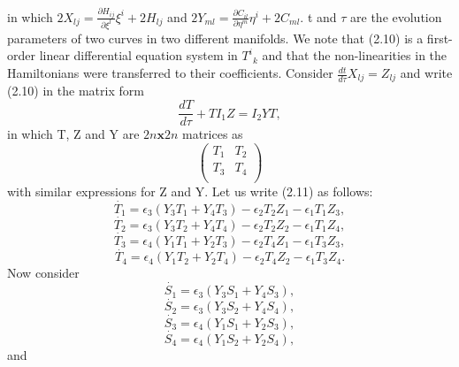 in which $2X_{lj}=\frac{\partial{H_{ij}}}{\partial{\xi}^l
}\xi^{i}+2H_{lj}$ and
$2Y_{ml}=\frac{\partial{C_{il}}}{\partial{\eta}^m
}\eta^{i}+2C_{ml}.$ t and $\tau$ are the evolution parameters of two curves in two different manifolds.
We note that (2.10) is a first-order linear differential equation system in ${{T}^i}_k $ and
that the non-linearities in the Hamiltonians were transferred to
their coefficients. Consider $\frac{d{t}}{d\tau}X_{lj}=Z_{lj}$ and
write (2.10) in the matrix form
\begin{equation}
 \frac{d{T}}{d\tau}+TI_{1}Z=I_{2}YT,
\end{equation}
in which T, Z and Y are $2n \textbf{x}2n$ matrices as
\begin{equation}
\left(%
\begin{array}{cc}
  T_{1} & T_{2} \\
  T_{3} & T_{4} \\
\end{array}%
\right)
\end{equation}
with similar expressions for Z and Y. Let us write (2.11) as
follows:
\begin{equation}
 \dot{T_1}=\epsilon_{3}(Y_{3}T_{1}+Y_{4}T_{3})-\epsilon_{2}T_{2}Z_{1}-\epsilon_{1}T_{1}Z_{3},
\end{equation}
\begin{equation}
 \dot{T_2}=\epsilon_{3}(Y_{3}T_{2}+Y_{4}T_{4})-\epsilon_{2}T_{2}Z_{2}-\epsilon_{1}T_{1}Z_{4},
\end{equation}
\begin{equation}
 \dot{T_3}=\epsilon_{4}(Y_{1}T_{1}+Y_{2}T_{3})-\epsilon_{2}T_{4}Z_{1}-\epsilon_{1}T_{3}Z_{3},
\end{equation}
\begin{equation}
 \dot{T_4}=\epsilon_{4}(Y_{1}T_{2}+Y_{2}T_{4})-\epsilon_{2}T_{4}Z_{2}-\epsilon_{1}T_{3}Z_{4}.
\end{equation}
Now consider
\begin{equation}
 \dot{S_1}=\epsilon_{3}(Y_{3}S_{1}+Y_{4}S_{3}),
\end{equation}
\begin{equation}
 \dot{S_2}=\epsilon_{3}(Y_{3}S_{2}+Y_{4}S_{4}),
\end{equation}
\begin{equation}
 \dot{S_3}=\epsilon_{4}(Y_{1}S_{1}+Y_{2}S_{3}),
\end{equation}
\begin{equation}
 \dot{S_4}=\epsilon_{4}(Y_{1}S_{2}+Y_{2}S_{4}),
\end{equation}
and
